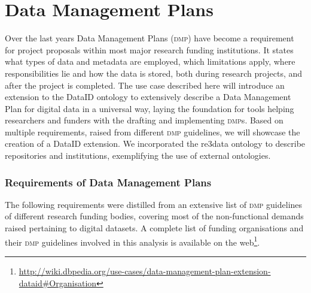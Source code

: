 \documentclass[runningheads,a4paper]{llncs}
\newcommand{\dmp}{{\scshape dmp}\xspace}
\newcommand\footnoteurl[1]{\footnote{\scriptsize\url{#1}}}
\begin{document}
\section{Data Management Plans}
\label{dmps}
Over the last years Data Management Plans (\dmp) have become a requirement for project proposals within most major research funding institutions. It states what types of data and metadata are employed, which limitations apply, where responsibilities lie and how the data is stored, both during research projects, and after the project is completed.
The use case described here will introduce an extension to the DataID ontology to extensively describe a Data Management Plan for digital data in a universal way, laying the foundation for tools helping researchers and funders with the drafting and implementing \dmp{}s. %
Based on multiple requirements, raised from different \dmp guidelines, we will showcase the creation of a DataID extension. We incorporated the re3data ontology to describe repositories and institutions, exemplifying the use of external ontologies.

\subsubsection{Requirements of Data Management Plans}
\label{requDmp}
The following requirements were distilled from an extensive list of \dmp guidelines of different research funding bodies,
covering most of the non-functional demands raised pertaining to digital datasets. A complete list of funding organisations and their \dmp guidelines involved in this analysis is available on the web\footnoteurl{http://wiki.dbpedia.org/use-cases/data-management-plan-extension-dataid\#Organisation}. 
\end{document}
